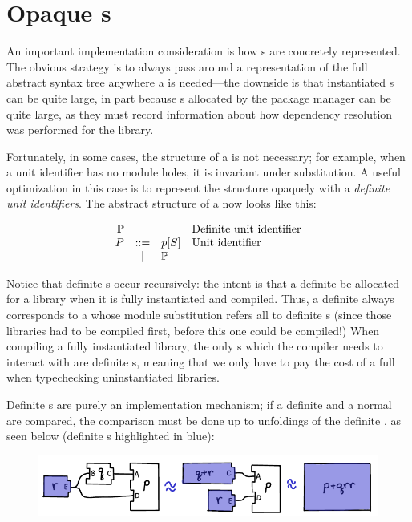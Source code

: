 \section{Opaque \uid{}s}

An important implementation consideration is how \uid{}s are
concretely represented.  The obvious strategy is to always pass
around a representation of the full abstract syntax tree anywhere
a \uid{} is needed---the downside is that instantiated \uid{}s
can be quite large, in part because \cid{}s allocated by the
package manager can be quite large, as they must record information
about how dependency resolution was performed for the library.

Fortunately, in some cases, the structure of a \uid{} is not necessary;
for example, when a unit identifier has no module holes, it is
invariant under substitution.  A useful optimization in this case
is to represent the structure opaquely with a \emph{definite unit
identifiers}.  The abstract structure of a \uid{} now looks like this:

\[
\begin{array}{rcll}
  \mathbb{P} &&& \text{Definite \uid{}} \\
  \UP &::=& \icid{\Up}{S} & \text{\Uid} \\
      & | & \mathbb{P} \\
\end{array}
\]

\noindent
Notice that definite \uid{}s occur recursively: the intent is that a
definite \uid{} be allocated for a library when it is fully instantiated
and compiled.  Thus, a definite \uid{} always corresponds to a \uid{}
whose module substitution refers all to definite \uid{}s (since those
libraries had to be compiled first, before this one could be compiled!)
When compiling a fully instantiated library, the only \uid{}s which the
compiler needs to interact with are definite \uid{}s, meaning that we
only have to pay the cost of a full \uid{} when typechecking uninstantiated
libraries.

Definite \uid{}s are purely an implementation mechanism; if a definite
\uid{} and a normal \uid{} are compared, the comparison must be done
up to unfoldings of the definite \uid{}, as seen below (definite \uid{}s
highlighted in blue):

\begin{figure}[H]
\center\includegraphics{figures/unit-identifier-improvement.pdf}
\end{figure}

